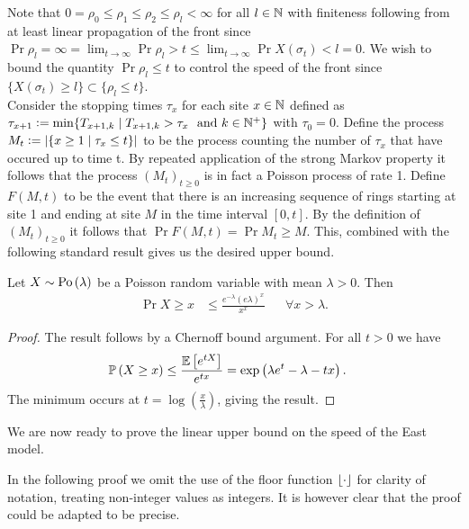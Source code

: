 Note that $0 = \rho_0 \leq \rho_1 \leq \rho_2 \leq \rho_l < \infty$ for all $l \in \mathbb{N}$ with finiteness following from at least linear propagation of the front since $\Pr{\rho_l = \infty} = \lim_{t \rightarrow \infty} \Pr{\rho_l > t} \leq \lim_{t \rightarrow \infty} \Pr{X\left( \sigma_t\right) < l} = 0$. We wish to bound the quantity $\Pr{\rho_l \leq t}$ to control the speed of the front since  $\{X \left( \sigma_t \right) \geq l \} \subset \{\rho_l \leq t \}$. \\

Consider the stopping times $\tau_x$ for each site $x \in \mathbb{N}$ defined as $\tau_{x+1} \vcentcolon= \min\{ T_{x+1, k} \mid T_{x+1, k} > \tau_x\ \text{ and } k \in \mathbb{N}^+ \}$ with $\tau_0 = 0$. Define the process $M_t \vcentcolon= |\{x \geq 1 \mid \tau_x \leq t \}|$ to be the process counting the number of $\tau_x$ that have occured up to time t. By repeated application of the strong Markov property it follows that the process $(M_t)_{t \geq 0}$ is in fact a Poisson process of rate 1. Define $F(M, t)$ to be the event that there is an increasing sequence of rings starting at site 1 and ending at site $M$ in the time interval $[0, t]$. By the definition of $(M_t)_{t \geq 0}$ it follows that $\Pr{F(M, t)} = \Pr{M_t \geq M}$. This, combined with the following standard result gives us the desired upper bound. 

\begin{lemma}\label{lem:chernoff}
Let $X \sim \text{Po} \left( \lambda \right)$ be a Poisson random variable with mean $\lambda > 0$. Then 
\begin{align*}
\Pr{X \geq x} &\leq \frac{e^{-\lambda}(e \lambda)^x}{x^x} &&\forall x > \lambda. 
\end{align*} 
\end{lemma}

\begin{proof}
The result follows by a Chernoff bound argument. For all $t > 0$ we have
\begin{align*}
\mathbb{P} \left( X \geq x \right) &\leq \frac{\mathbb{E}\left[ e^{tX} \right]}{e^{tx}} = \exp\left( \lambda e^t - \lambda - tx \right). 
\end{align*} 
The minimum occurs at $t = \log\left( \frac{x}{\lambda} \right)$, giving the result. 
\end{proof}

We are now ready to prove the linear upper bound on the speed of the East model.

\begin{remark}
In the following proof we omit the use of the floor function $\lfloor\cdot\rfloor$ for clarity of notation, treating non-integer values as integers. It is however clear that the proof could be adapted to be precise. 
\end{remark}

